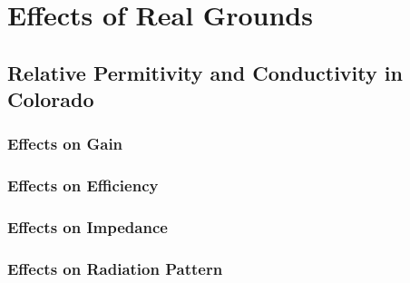 \section{Effects of Real Grounds}

\subsection{Relative Permitivity and Conductivity in Colorado}
\subsubsection{Effects on Gain}
\subsubsection{Effects on Efficiency}
\subsubsection{Effects on Impedance}
\subsubsection{Effects on Radiation Pattern}
